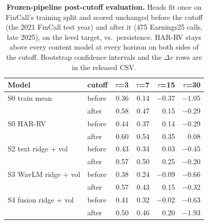 \begin{table}[t]
\centering
\scriptsize
\setlength{\tabcolsep}{3pt}
\begin{tabular}{llrrrr}
\toprule
Model & cutoff & $\tau$=3 & $\tau$=7 & $\tau$=15 & $\tau$=30 \\
\midrule
S0 train mean & before & 0.36 & 0.14 & $-$0.37 & $-$1.05 \\
 & after & 0.58 & 0.47 & 0.15 & $-$0.29 \\
S0 HAR-RV & before & 0.44 & 0.37 & 0.14 & $-$0.29 \\
 & after & 0.60 & 0.54 & 0.35 & 0.08 \\
S2 text ridge + vol & before & 0.43 & 0.34 & 0.03 & $-$0.45 \\
 & after & 0.57 & 0.50 & 0.25 & $-$0.20 \\
S3 WavLM ridge + vol & before & 0.38 & 0.24 & $-$0.09 & $-$0.66 \\
 & after & 0.57 & 0.43 & 0.15 & $-$0.32 \\
S4 fusion ridge + vol & before & 0.41 & 0.32 & $-$0.02 & $-$0.63 \\
 & after & 0.50 & 0.46 & 0.20 & $-$1.93 \\
\bottomrule
\end{tabular}
\caption{\textbf{Frozen-pipeline post-cutoff evaluation.}
Heads fit once on FinCall's training split and scored unchanged before the cutoff
(the 2021 FinCall test year) and after it (475 Earnings25 calls, late 2025), on the
level target, \Rtwo{} vs.\ persistence. HAR-RV stays above every content model at
every horizon on both sides of the cutoff.
Bootstrap confidence intervals and the $\Delta v$ rows are in the released CSV.}
\label{tab:lookahead}
\end{table}
